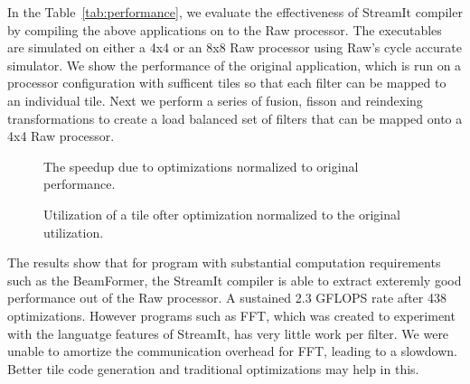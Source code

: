In the Table~\ref{tab:performance}, we evaluate the effectiveness of
StreamIt compiler by compiling the above applications on to the Raw
processor. The executables are simulated on either a 4x4 or an 8x8 Raw
processor using Raw's cycle accurate simulator. We show the
performance of the original application, which is run on a processor
configuration with sufficent tiles so that each filter can be mapped
to an individual tile. Next we perform a series of fusion, fisson and
reindexing transformations to create a load balanced set of filters
that can be mapped onto a 4x4 Raw processor.

\begin{figure}
\begin{minipage}{3.2in}
\centering
{}
\caption{The speedup due to optimizations normalized to original performance.
\protect\label{fig:opt-diagram}}
\end{minipage}
\hspace{0.1in}
\begin{minipage}{3.2in}
\centering
{}
\caption{Utilization of a tile ofter optimization normalized to the original utilization.}
\end{minipage}
\end{figure}

The results show that for program with substantial computation
requirements such as the BeamFormer, the StreamIt compiler is able to
extract exteremly good performance out of the Raw processor. A
sustained 2.3 GFLOPS rate after 438%
optimizations. However programs such as FFT, which was created to
experiment with the languatge features of StreamIt, has very little
work per filter. We were unable to amortize the communication
overhead for FFT, leading to a slowdown. Better tile code generation
and traditional optimizations may help in this. 


